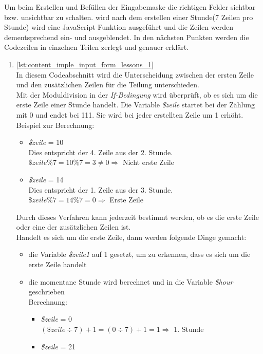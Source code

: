 Um beim Erstellen und Befüllen der Eingabemaske die richtigen Felder sichtbar bzw. unsichtbar zu schalten. wird nach dem erstellen einer Stunde(7 Zeilen pro Stunde) wird eine JavaScript Funktion ausgeführt und die Zeilen werden dementsprechend ein- und ausgeblendet.
In den nächsten Punkten werden die Codezeilen in einzelnen Teilen zerlegt und genauer erklärt.
\begin{enumerate}
	\item \autoref{lst:content_imple_input_form_lessons_1}\\
	In diesem Codeabschnitt wird die Unterscheidung zwischen der ersten Zeile und den zusätzlichen Zeilen für die Teilung unterschieden.\\
	Mit der Moduldivision in der \textit{If-Bedingung} wird überprüft, ob es sich um die erste Zeile einer Stunde handelt. Die Variable \textit{\$zeile} startet bei der Zählung mit 0 und endet bei 111. Sie wird bei jeder erstellten Zeile um 1 erhöht.\\
	Beispiel zur Berechnung:
	\begin{itemize}
		\item \textit{\$zeile} = 10\\
		Dies entspricht der 4. Zeile aus der 2. Stunde.\\
		$ \$zeile \% 7 = 10 \% 7 = 3 \ne 0 \Rightarrow $ Nicht erste Zeile
		\item \textit{\$zeile} = 14\\
		Dies entspricht der 1. Zeile aus der 3. Stunde.\\
		$ \$zeile \% 7 = 14 \% 7 = 0 \Rightarrow $ Erste Zeile
	\end{itemize}
	Durch dieses Verfahren kann jederzeit bestimmt werden, ob es die erste Zeile oder eine der zusätzlichen Zeilen ist.\\
	Handelt es sich um die erste Zeile, dann werden folgende Dinge gemacht:
	\begin{itemize}
		\item die Variable \textit{\$zeile1} auf 1 gesetzt, um zu erkennen, dass es sich um die erste Zeile handelt
		\item die momentane Stunde wird berechnet und in die Variable \textit{\$hour} geschrieben\\
		Berechnung:
		\begin{itemize}
			\item \textit{\$zeile} = 0\\
			$ (\$zeile \div 7) + 1 = ( 0 \div 7 ) + 1 = 1 \Rightarrow $ 1. Stunde
			\item \textit{\$zeile} = 21\\

\end{itemize}
\end{itemize}
\end{enumerate}
